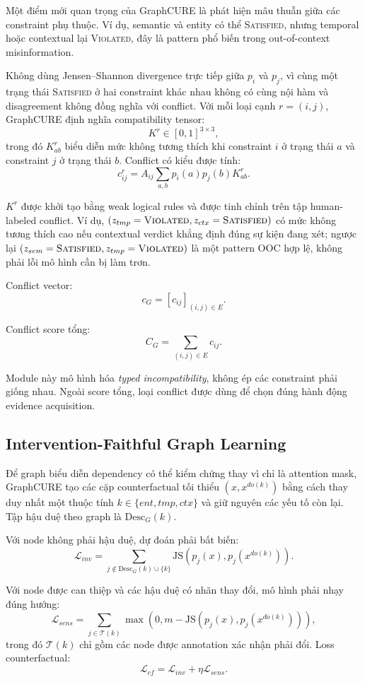 \documentclass[11pt,a4paper]{article}
\newcommand{\Sat}{\textsc{Satisfied}}
\newcommand{\Viol}{\textsc{Violated}}
\begin{document}
Một điểm mới quan trọng của GraphCURE là phát hiện mâu thuẫn giữa các constraint phụ thuộc. Ví dụ, semantic và entity có thể \Sat{}, nhưng temporal hoặc contextual lại \Viol{}, đây là pattern phổ biến trong out-of-context misinformation.

Không dùng Jensen--Shannon divergence trực tiếp giữa $p_i$ và $p_j$, vì cùng một trạng thái \Sat{} ở hai constraint khác nhau không có cùng nội hàm và disagreement không đồng nghĩa với conflict. Với mỗi loại cạnh $r=(i,j)$, GraphCURE định nghĩa compatibility tensor:
\[
K^{r}\in[0,1]^{3\times 3},
\]
trong đó $K^{r}_{ab}$ biểu diễn mức không tương thích khi constraint $i$ ở trạng thái $a$ và constraint $j$ ở trạng thái $b$. Conflict có kiểu được tính:
\[
c_{ij}^{r}
=
A_{ij}\sum_{a,b}p_i(a)p_j(b)K^{r}_{ab}.
\]

$K^r$ được khởi tạo bằng weak logical rules và được tinh chỉnh trên tập human-labeled conflict. Ví dụ, $(z_{tmp}=\Viol,z_{ctx}=\Sat)$ có mức không tương thích cao nếu contextual verdict khẳng định đúng sự kiện đang xét; ngược lại $(z_{sem}=\Sat,z_{tmp}=\Viol)$ là một pattern OOC hợp lệ, không phải lỗi mô hình cần bị làm trơn.

Conflict vector:
\[
c_G = [c_{ij}]_{(i,j)\in E}.
\]

Conflict score tổng:
\[
C_G = \sum_{(i,j)\in E} c_{ij}.
\]

Module này mô hình hóa \emph{typed incompatibility}, không ép các constraint phải giống nhau. Ngoài score tổng, loại conflict được dùng để chọn đúng hành động evidence acquisition.

\subsection{Intervention-Faithful Graph Learning}

Để graph biểu diễn dependency có thể kiểm chứng thay vì chỉ là attention mask, GraphCURE tạo các cặp counterfactual tối thiểu $(x,x^{do(k)})$ bằng cách thay duy nhất một thuộc tính $k\in\{ent,tmp,ctx\}$ và giữ nguyên các yếu tố còn lại. Tập hậu duệ theo graph là $\mathrm{Desc}_G(k)$.

Với node không phải hậu duệ, dự đoán phải bất biến:
\[
\mathcal{L}_{inv}
=
\sum_{j\notin \mathrm{Desc}_G(k)\cup\{k\}}
\mathrm{JS}\!\left(p_j(x),p_j(x^{do(k)})\right).
\]

Với node được can thiệp và các hậu duệ có nhãn thay đổi, mô hình phải nhạy đúng hướng:
\[
\mathcal{L}_{sens}
=
\sum_{j\in \mathcal{T}(k)}
\max\!\left(0,m-
\mathrm{JS}\!\left(p_j(x),p_j(x^{do(k)})\right)\right),
\]
trong đó $\mathcal{T}(k)$ chỉ gồm các node được annotation xác nhận phải đổi. Loss counterfactual:
\[
\mathcal{L}_{cf}=\mathcal{L}_{inv}+\eta\mathcal{L}_{sens}.
\]
\end{document}
